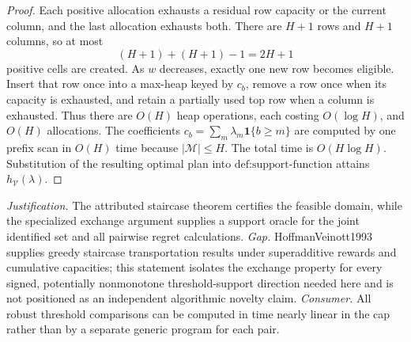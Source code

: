 \documentclass{article}
\begin{document}
\begin{proof}
Each positive allocation exhausts a residual row capacity or the current column, and the last allocation exhausts both.  There are \(H+1\) rows and \(H+1\) columns, so at most
\[
 (H+1)+(H+1)-1=2H+1                                      \tag{4}
\]
positive cells are created.  As \(w\) decreases, exactly one new row becomes eligible.  Insert that row once into a max-heap keyed by \(c_b\), remove a row once when its capacity is exhausted, and retain a partially used top row when a column is exhausted.  Thus there are \(O(H)\) heap operations, each costing \(O(\log H)\), and \(O(H)\) allocations.  The coefficients \(c_b=\sum_m\lambda_m\mathbf 1\{b\ge m\}\) are computed by one prefix scan in \(O(H)\) time because \(|\mathcal M|\le H\).  The total time is \(O(H\log H)\).  Substitution of the resulting optimal plan into \(\text{def:support-function}\) attains \(h_{\mathcal V}(\lambda)\).
\end{proof}
\par\smallskip\noindent \textit{Justification.} The attributed staircase theorem certifies the feasible domain, while the specialized exchange argument supplies a support oracle for the joint identified set and all pairwise regret calculations. \textit{Gap.} HoffmanVeinott1993 supplies greedy staircase transportation results under superadditive rewards and cumulative capacities; this statement isolates the exchange property for every signed, potentially nonmonotone threshold-support direction needed here and is not positioned as an independent algorithmic novelty claim. \textit{Consumer.} All robust threshold comparisons can be computed in time nearly linear in the cap rather than by a separate generic program for each pair.
\end{document}
